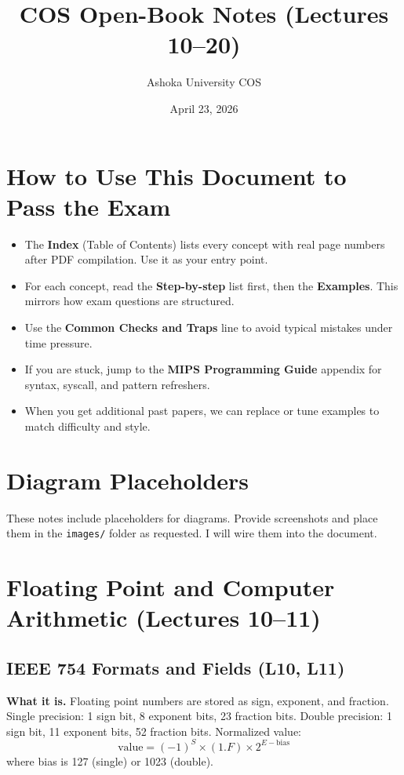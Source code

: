\documentclass[11pt]{article}
\title{COS Open-Book Notes (Lectures 10--20)}
\author{Ashoka University COS}\date{April 23, 2026}
\begin{document}
\maketitle

\tableofcontents
\newpage

\section*{How to Use This Document to Pass the Exam}
\begin{itemize}[leftmargin=*]
  \item The \textbf{Index} (Table of Contents) lists every concept with real page numbers after PDF compilation. Use it as your entry point.
  \item For each concept, read the \textbf{Step-by-step} list first, then the \textbf{Examples}. This mirrors how exam questions are structured.
  \item Use the \textbf{Common Checks and Traps} line to avoid typical mistakes under time pressure.
  \item If you are stuck, jump to the \textbf{MIPS Programming Guide} appendix for syntax, syscall, and pattern refreshers.
  \item When you get additional past papers, we can replace or tune examples to match difficulty and style.
\end{itemize}

\section*{Diagram Placeholders}
These notes include placeholders for diagrams. Provide screenshots and place them in the \texttt{images/} folder as requested. I will wire them into the document.

\newpage

\section{Floating Point and Computer Arithmetic (Lectures 10--11)}

\subsection{IEEE 754 Formats and Fields (L10, L11)}
\textbf{What it is.} Floating point numbers are stored as sign, exponent, and fraction. Single precision: 1 sign bit, 8 exponent bits, 23 fraction bits. Double precision: 1 sign bit, 11 exponent bits, 52 fraction bits. Normalized value:
\[\text{value} = (-1)^S \times (1.F) \times 2^{E-\text{bias}}\]
where bias is 127 (single) or 1023 (double).
\end{document}
